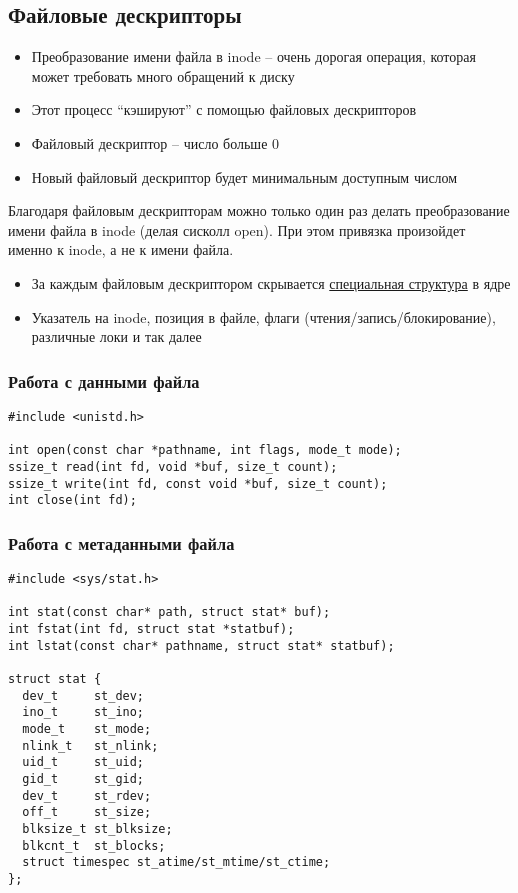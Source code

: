   \subsection{Файловые дескрипторы}
    \begin{itemize}
      \item Преобразование имени файла в inode -- очень дорогая операция, которая может требовать много обращений к диску
      \item Этот процесс ``кэшируют'' с помощью файловых дескрипторов
      \item Файловый дескриптор -- число больше 0
      \item Новый файловый дескриптор будет минимальным доступным числом
    \end{itemize}
  Благодаря файловым дескрипторам можно только один раз делать преобразование имени файла в inode (делая сисколл open). При этом привязка произойдет именно к inode, а не к имени файла.
    \begin{itemize}
      \item За каждым файловым дескриптором скрывается \href{https://elixir.bootlin.com/linux/v5.19.12/source/include/linux/fs.h#L925}{специальная структура} в ядре
      \item Указатель на inode, позиция в файле, флаги (чтения/запись/блокирование), различные локи и так далее
    \end{itemize}
  
    \subsubsection{Работа с данными файла}
\begin{lstlisting}[style=cpp]
#include <unistd.h>

int open(const char *pathname, int flags, mode_t mode);
ssize_t read(int fd, void *buf, size_t count);
ssize_t write(int fd, const void *buf, size_t count);
int close(int fd);
\end{lstlisting}
    
    \subsubsection{Работа с метаданными файла}
\begin{lstlisting}[style=cpp]
#include <sys/stat.h>

int stat(const char* path, struct stat* buf);
int fstat(int fd, struct stat *statbuf);
int lstat(const char* pathname, struct stat* statbuf);

struct stat {
  dev_t     st_dev;
  ino_t     st_ino;
  mode_t    st_mode;
  nlink_t   st_nlink;
  uid_t     st_uid;
  gid_t     st_gid;
  dev_t     st_rdev;
  off_t     st_size;
  blksize_t st_blksize;
  blkcnt_t  st_blocks;
  struct timespec st_atime/st_mtime/st_ctime;
};
\end{lstlisting}
    
